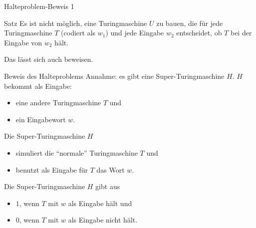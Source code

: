 \begin{frame}{Halteproblem-Beweis 1}
    \begin{block}{Satz}
        Es ist nicht möglich, eine Turingmaschine $U$ zu bauen, die für jede Turingmaschine $T$ (codiert als $w_1$) und jede Eingabe $w_2$  entscheidet, ob $T$ bei der Eingabe von $w_2$ hält.
    \end{block}
    Das lässt sich auch beweisen. 
\end{frame}
\begin{frame}{Beweis des Halteproblems}
    Annahme: es gibt eine Super-Turingmaschine $H$. $H$ bekommt als Eingabe:
    \begin{itemize}
        \item eine andere Turingmaschine $T$ und
        \item ein Eingabewort $w$.
    \end{itemize}
    \pause
    Die Super-Turingmaschine $H$ 
    \begin{itemize}
        \item simuliert die ``normale'' Turingmaschine $T$ und
        \item benutzt als Eingabe für $T$ das Wort $w$.
    \end{itemize}
    \pause
    Die Super-Turingmaschine $H$ gibt aus
    \begin{itemize}
        \item $1$, wenn $T$ mit $w$ als Eingabe hält und
        \item $0$, wenn $T$ mit $w$ als Eingabe nicht hält.
    \end{itemize}
\end{frame}
